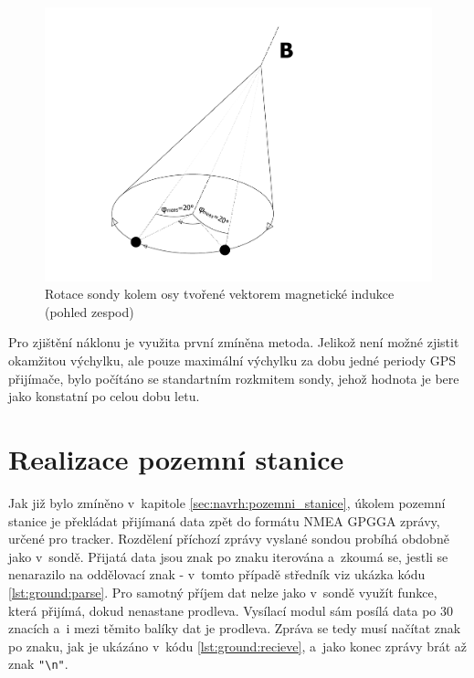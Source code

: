 \documentclass[twoside]{ctuthesis}
\theoremstyle{plain}
\theoremstyle{definition}
\theoremstyle{note}
\begin{document}
		\begin{figure}[hbtp]
			\centering
			\includegraphics[width=.5\textwidth]{Figures/sonda_naklon_mag_osova_rotace.pdf}
			\caption{Rotace sondy kolem osy tvořené vektorem magnetické indukce (pohled zespod)}
			\label{fig:sonda:mag:rot}
		\end{figure}

		Pro zjištění náklonu je využita první zmíněna metoda. Jelikož není možné zjistit okamžitou výchylku, ale pouze maximální výchylku za dobu jedné periody GPS přijímače, bylo počítáno se standartním rozkmitem sondy, jehož hodnota je bere jako konstatní po celou dobu letu. 
		


	












	
	\section{Realizace pozemní stanice}

	Jak již bylo zmíněno v~kapitole \ref{sec:navrh:pozemni_stanice}, úkolem pozemní stanice je překládat přijímaná data zpět do formátu NMEA GPGGA zprávy, určené pro tracker. Rozdělení příchozí zprávy vyslané sondou probíhá obdobně jako v~sondě. Přijatá data jsou znak po znaku iterována a~zkoumá se, jestli se nenarazilo na oddělovací znak - v~tomto případě středník viz ukázka kódu \ref{lst:ground:parse}. Pro samotný příjem dat nelze jako v~sondě využít funkce, která přijímá, dokud nenastane prodleva. Vysílací modul sám posílá data po 30 znacích a~i mezi těmito balíky dat je prodleva. Zpráva se tedy musí načítat znak po znaku, jak je ukázáno v~kódu \ref{lst:ground:recieve}, a~jako konec zprávy brát až znak \lstinline |"\n"|.
\end{document}
